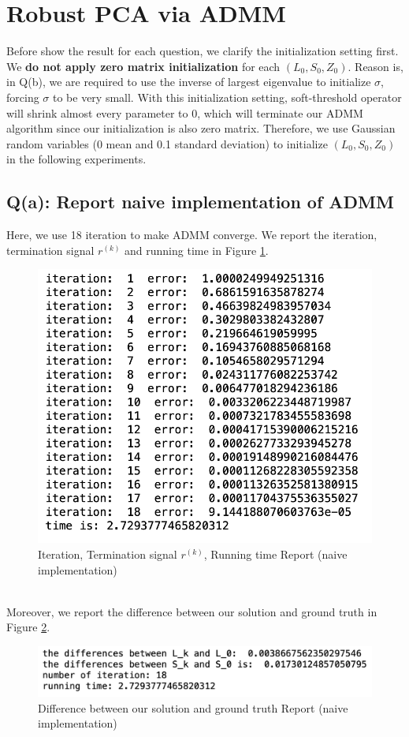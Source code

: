 \documentclass{article}
\begin{document}
\section{Robust PCA via ADMM}
Before show the result for each question, we clarify the initialization setting first. We \textbf{do not apply zero matrix initialization} for each $(L_0, S_0, Z_0)$. Reason is, in Q(b), we are required to use the inverse of largest eigenvalue to initialize $\sigma$, forcing $\sigma$ to be very small. With this initialization setting, soft-threshold operator will shrink almost every parameter to 0, which will terminate our ADMM algorithm since our initialization is also zero matrix. Therefore, we use Gaussian random variables (0 mean and 0.1 standard deviation) to initialize $(L_0, S_0, Z_0)$ in the following experiments. 
\subsection{Q(a): Report naive implementation of ADMM}
Here, we use 18 iteration to make ADMM converge. We report the iteration, termination signal $r^{(k)}$ and running time in Figure \ref{fig:qa1}.
\begin{figure}[h]
	\centering
	\includegraphics[width=.35\textheight]{qa1.png}
	\caption{Iteration, Termination signal $r^{(k)}$, Running time Report (naive implementation)}
	\label{fig:qa1}
\end{figure}
\\
Moreover, we report the difference between our solution and ground truth in Figure \ref{fig:qa2}.
\begin{figure}[h]
	\centering
	\includegraphics[width=.35\textheight]{qa2.png}
	\caption{Difference between our solution and ground truth Report (naive implementation)}
	\label{fig:qa2}
\end{figure}
\\
\end{document}
